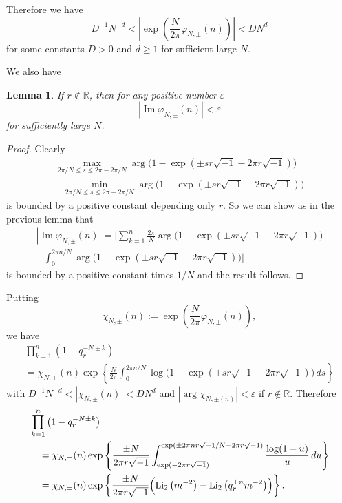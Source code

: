 \documentclass[a4paper]{amsart}
\theoremstyle{plain}
\newtheorem{lem}[thm]{Lemma}
\theoremstyle{definition}
\theoremstyle{remark}
\newcommand{\R}{\mathbb{R}}
\newcommand{\Li}{\operatorname{Li}}
\renewcommand{\Im}{\operatorname{Im}}
\numberwithin{equation}{section}
\begin{document}
Therefore we have
\begin{equation*}
  D^{-1}N^{-d}
  <
  \left|
    \exp\left(\frac{N}{2\pi}\varphi_{N,\pm}(n)\right)
  \right|
  <
  DN^d
\end{equation*}
for some constants $D>0$ and $d\ge1$ for sufficient large $N$.
\par
We also have
\begin{lem}
If $r\not\in\R$, then for any positive number $\varepsilon$
\begin{equation*}
  \left|\Im\varphi_{N,\pm}(n)\right|
  <
  \varepsilon
\end{equation*}
for sufficiently large $N$.
\end{lem}
\begin{proof}
Clearly
\begin{multline*}
  \max_{2\pi/N\le{s}\le2\pi-2\pi/N}
  \arg\bigl(1-\exp(\pm{sr}\sqrt{-1}-2\pi{r}\sqrt{-1})\bigr)
  \\
  -
  \min_{2\pi/N\le{s}\le2\pi-2\pi/N}
  \arg\bigl(1-\exp(\pm{sr}\sqrt{-1}-2\pi{r}\sqrt{-1})\bigr)
\end{multline*}
is bounded by a positive constant depending only $r$.
So we can show as in the previous lemma that
\begin{multline*}
  \left|\Im\varphi_{N,\pm}(n)\right|
  =
  \Biggl|
    \sum_{k=1}^{n}\frac{2\pi}{N}
    \arg\bigl(1-\exp(\pm{sr}\sqrt{-1}-2\pi{r}\sqrt{-1})\bigr)
  \\
    -
    \int_{0}^{2\pi{n}/N}
    \arg\bigl(1-\exp(\pm{sr}\sqrt{-1}-2\pi{r}\sqrt{-1})\bigr)
  \Biggr|
\end{multline*}
is bounded by a positive constant times $1/N$ and the result follows.
\end{proof}
Putting
\begin{equation*}
  \chi_{N,\pm}(n):=\exp\left(\frac{N}{2\pi}\varphi_{N,\pm}(n)\right),
\end{equation*}
we have
\begin{multline*}
  \prod_{k=1}^{n}
  \left(1-q_r^{-N\pm{k}}\right)
  \\
  =
  \chi_{N,\pm}(n)
  \exp
  \left\{
    \frac{N}{2\pi}
    \int_{0}^{2\pi{n}/N}
    \log\bigl(1-\exp(\pm{sr}\sqrt{-1}-2\pi{r}\sqrt{-1})\bigr)\,ds
  \right\}
\end{multline*}
with $D^{-1}N^{-d}<\left|\chi_{N,\pm}(n)\right|<DN^d$ and
$|\arg\chi_{N,\pm(n)}|<\varepsilon$ if $r\not\in\R$.
Therefore
\begin{equation*}
\begin{split}
  &\prod_{k=1}^{n}
  \left(1-q_r^{-N\pm{k}}\right)
  \\
  &\quad=
  \chi_{N,\pm}(n)
  \exp
  \left\{
    \frac{\pm{N}}{2\pi{r}\sqrt{-1}}
    \int_{\exp(-2\pi{r}\sqrt{-1})}
        ^{\exp(\pm2\pi{nr}\sqrt{-1}/N-2\pi{r}\sqrt{-1})}
    \frac{\log(1-u)}{u}\,du
  \right\}
  \\
  &\quad=
  \chi_{N,\pm}(n)
  \exp
  \left\{
    \frac{\pm{N}}{2\pi{r}\sqrt{-1}}
    \Bigl(
      \Li_2\left(m^{-2}\right)-\Li_2\left(q_r^{\pm{n}}m^{-2}\right)
    \Bigr)
  \right\}.
\end{split}
\end{equation*}
\end{document}
